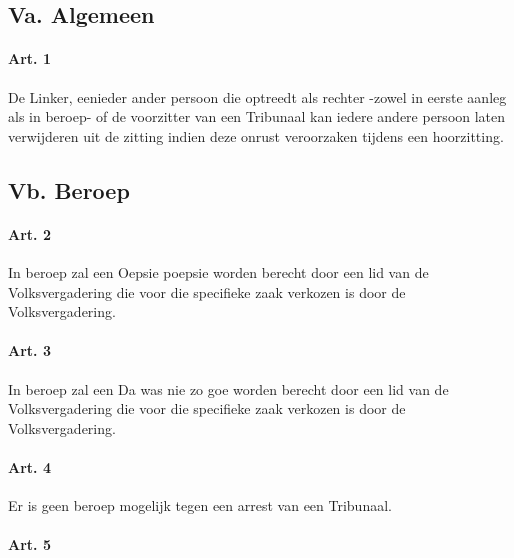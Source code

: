 \hypertarget{va.-algemeen}{%
\subsection{Va. Algemeen}\label{va.-algemeen}}

\hypertarget{art.-1}{%
\paragraph{Art. 1}\label{art.-1}}

De Linker, eenieder ander persoon die optreedt als rechter -zowel in
eerste aanleg als in beroep- of de voorzitter van een Tribunaal kan
iedere andere persoon laten verwijderen uit de zitting indien deze
onrust veroorzaken tijdens een hoorzitting.

\hypertarget{vb.-beroep}{%
\subsection{Vb. Beroep}\label{vb.-beroep}}

\hypertarget{art.-2}{%
\paragraph{Art. 2}\label{art.-2}}

In beroep zal een Oepsie poepsie worden berecht door een lid van de
Volksvergadering die voor die specifieke zaak verkozen is door de
Volksvergadering.

\hypertarget{art.-3}{%
\paragraph{Art. 3}\label{art.-3}}

In beroep zal een Da was nie zo goe worden berecht door een lid van de
Volksvergadering die voor die specifieke zaak verkozen is door de
Volksvergadering.

\hypertarget{art.-4}{%
\paragraph{Art. 4}\label{art.-4}}

Er is geen beroep mogelijk tegen een arrest van een Tribunaal.

\hypertarget{art.-5}{%
\paragraph{Art. 5}\label{art.-5}}

